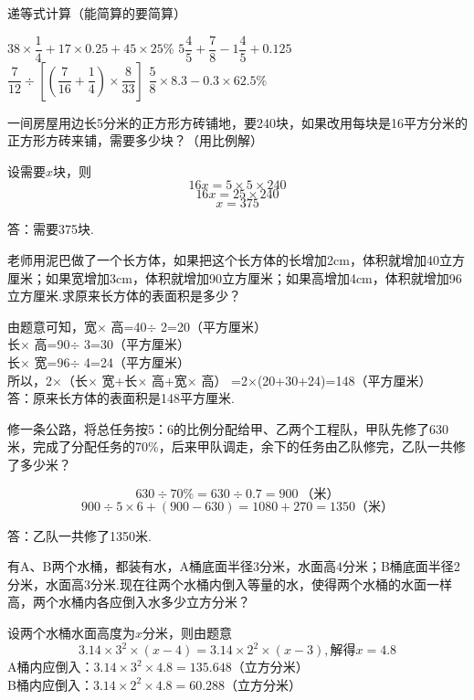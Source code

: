 \documentclass[marginline,answers]{BHCexam}
\begin{document}
\begin{questions}
\question[8] 递等式计算（能简算的要简算）

$38\times \dfrac{1}{4}+17\times 0.25+45\times 25\%$ \hspace{4cm} $5\dfrac{4}{5}+\dfrac{7}{8}-1\dfrac{4}{5}+0.125$\\
$\dfrac{7}{12}\div [(\dfrac{7}{16}+\dfrac{1}{4})\times \dfrac{8}{33}]$ \hspace{5.4cm} $\dfrac{5}{8}\times 8.3-0.3\times 62.5\%$


\jiandac
\question[4] 一间房屋用边长5分米的正方形方砖铺地，要240块，如果改用每块是16平方分米的正方形方砖来铺，需要多少块？（用比例解）

\begin{solution}{\cyan
设需要$x$块，则
\[16x=5\times 5\times 240 \]
\[16x=25\times 240\]
\[x=375\]

答：需要375块.}
\end{solution}

\question[5] 老师用泥巴做了一个长方体，如果把这个长方体的长增加2cm，体积就增加40立方厘米；如果宽增加3cm，体积就增加90立方厘米；如果高增加4cm，体积就增加96立方厘米.求原来长方体的表面积是多少？

\begin{solution}{\cyan
	由题意可知，宽$\times$ 高=40$\div$ 2=20（平方厘米）\\
	长$\times$ 高=90$\div$ 3=30（平方厘米）\\
	长$\times$ 宽=96$\div$ 4=24（平方厘米）\\
	所以，2$\times$（长$\times$ 宽+长$\times$ 高+宽$\times$ 高）
	=2$\times$(20+30+24)=148（平方厘米）\\
	答：原来长方体的表面积是148平方厘米.}
\end{solution}


\jiandad
\question[5] 修一条公路，将总任务按5：6的比例分配给甲、乙两个工程队，甲队先修了630米，完成了分配任务的70\%，后来甲队调走，余下的任务由乙队修完，乙队一共修了多少米？

\begin{solution}{\cyan
\[630\div 70\%=630\div 0.7=900~\text{（米）}\]
\[900\div 5\times 6+(900-630)=1080+270=1350\text{（米）}\]

答：乙队一共修了1350米.}
\end{solution}


\question[5] 有A、B两个水桶，都装有水，A桶底面半径3分米，水面高4分米；B桶底面半径2分米，水面高3分米.现在往两个水桶内倒入等量的水，使得两个水桶的水面一样高，两个水桶内各应倒入水多少立方分米？

\begin{solution}{\cyan
设两个水桶水面高度为$x$分米，则由题意
\[3.14\times 3^{2}\times (x-4)=3.14\times 2^{2}\times (x-3),\text{解得}x=4.8\]
A桶内应倒入：$3.14\times 3^{2}\times 4.8=135.648$（立方分米）\\
B桶内应倒入：$3.14\times 2^{2}\times 4.8=60.288$（立方分米）	}
\end{solution}



\end{questions}
\end{document}
